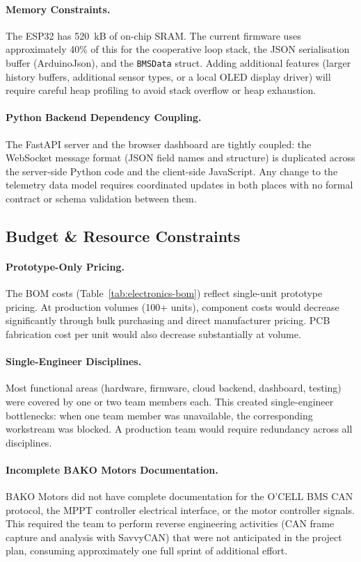 \paragraph{Memory Constraints.}
The ESP32 has 520~kB of on-chip SRAM. The current firmware uses approximately 40\% of this for the cooperative loop stack, the JSON serialisation buffer (ArduinoJson), and the \texttt{BMSData} struct. Adding additional features (larger history buffers, additional sensor types, or a local OLED display driver) will require careful heap profiling to avoid stack overflow or heap exhaustion.

\paragraph{Python Backend Dependency Coupling.}
The FastAPI server and the browser dashboard are tightly coupled: the WebSocket message format (JSON field names and structure) is duplicated across the server-side Python code and the client-side JavaScript. Any change to the telemetry data model requires coordinated updates in both places with no formal contract or schema validation between them.

\subsection{Budget \& Resource Constraints}

\paragraph{Prototype-Only Pricing.}
The BOM costs (Table~\ref{tab:electronics-bom}) reflect single-unit prototype pricing. At production volumes (100+ units), component costs would decrease significantly through bulk purchasing and direct manufacturer pricing. PCB fabrication cost per unit would also decrease substantially at volume.

\paragraph{Single-Engineer Disciplines.}
Most functional areas (hardware, firmware, cloud backend, dashboard, testing) were covered by one or two team members each. This created single-engineer bottlenecks: when one team member was unavailable, the corresponding workstream was blocked. A production team would require redundancy across all disciplines.

\paragraph{Incomplete BAKO Motors Documentation.}
BAKO Motors did not have complete documentation for the O'CELL BMS CAN protocol, the MPPT controller electrical interface, or the motor controller signals. This required the team to perform reverse engineering activities (CAN frame capture and analysis with SavvyCAN) that were not anticipated in the project plan, consuming approximately one full sprint of additional effort.

